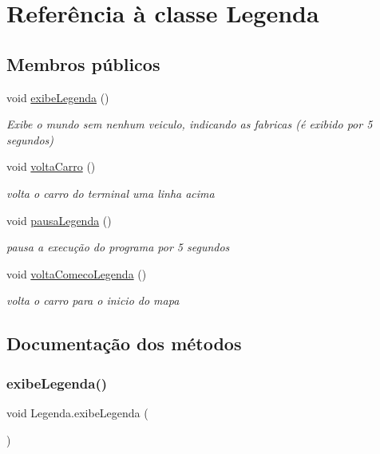 \hypertarget{class_legenda}{}\section{Referência à classe Legenda}
\label{class_legenda}
\subsection*{Membros públicos}
\begin{DoxyCompactItemize}
\item 
void \mbox{\hyperlink{class_legenda_a213202792f82e028c9e144aadad36ee9}{exibe\+Legenda}} ()
\begin{DoxyCompactList}\small\item\em Exibe o mundo sem nenhum veiculo, indicando as fabricas (é exibido por 5 segundos) \end{DoxyCompactList}\item 
void \mbox{\hyperlink{class_legenda_ad2b8f204bbb24bf96a198f5e76e908fe}{volta\+Carro}} ()
\begin{DoxyCompactList}\small\item\em volta o carro do terminal uma linha acima \end{DoxyCompactList}\item 
void \mbox{\hyperlink{class_legenda_a30586aa3859ac3880a8f5d2acc7a5cb5}{pausa\+Legenda}} ()
\begin{DoxyCompactList}\small\item\em pausa a execução do programa por 5 segundos \end{DoxyCompactList}\item 
void \mbox{\hyperlink{class_legenda_a0c879e1772bd84a55e9c1cca7d5678dc}{volta\+Comeco\+Legenda}} ()
\begin{DoxyCompactList}\small\item\em volta o carro para o inicio do mapa \end{DoxyCompactList}\end{DoxyCompactItemize}


\subsection{Documentação dos métodos}
\mbox{\label{class_legenda_a213202792f82e028c9e144aadad36ee9}} 
\subsubsection{\texorpdfstring{exibe\+Legenda()}{exibeLegenda()}}
{\footnotesize\ttfamily void Legenda.\+exibe\+Legenda (\begin{DoxyParamCaption}{ }\end{DoxyParamCaption})}



